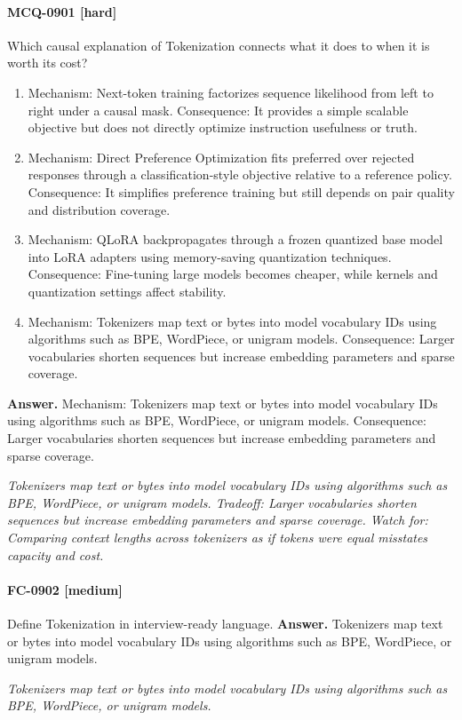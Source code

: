 \paragraph{MCQ-0901 [hard]} Which causal explanation of Tokenization connects what it does to when it is worth its cost?
\begin{enumerate}[label=\Alph*.]
\item Mechanism: Next-token training factorizes sequence likelihood from left to right under a causal mask. Consequence: It provides a simple scalable objective but does not directly optimize instruction usefulness or truth.
\item Mechanism: Direct Preference Optimization fits preferred over rejected responses through a classification-style objective relative to a reference policy. Consequence: It simplifies preference training but still depends on pair quality and distribution coverage.
\item Mechanism: QLoRA backpropagates through a frozen quantized base model into LoRA adapters using memory-saving quantization techniques. Consequence: Fine-tuning large models becomes cheaper, while kernels and quantization settings affect stability.
\item Mechanism: Tokenizers map text or bytes into model vocabulary IDs using algorithms such as BPE, WordPiece, or unigram models. Consequence: Larger vocabularies shorten sequences but increase embedding parameters and sparse coverage.
\end{enumerate}
\noindent\textbf{Answer.} Mechanism: Tokenizers map text or bytes into model vocabulary IDs using algorithms such as BPE, WordPiece, or unigram models. Consequence: Larger vocabularies shorten sequences but increase embedding parameters and sparse coverage.
\par\textit{Tokenizers map text or bytes into model vocabulary IDs using algorithms such as BPE, WordPiece, or unigram models. Tradeoff: Larger vocabularies shorten sequences but increase embedding parameters and sparse coverage. Watch for: Comparing context lengths across tokenizers as if tokens were equal misstates capacity and cost.}
\paragraph{FC-0902 [medium]} Define Tokenization in interview-ready language.
\noindent\textbf{Answer.} Tokenizers map text or bytes into model vocabulary IDs using algorithms such as BPE, WordPiece, or unigram models.
\par\textit{Tokenizers map text or bytes into model vocabulary IDs using algorithms such as BPE, WordPiece, or unigram models.}
